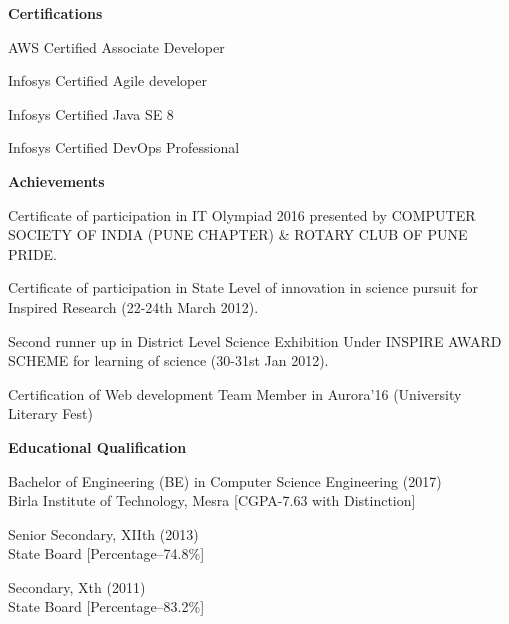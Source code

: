 \documentclass[a4paper,10pt]{article}
\newcommand{\resitem}[1]{\item #1}
\newcommand{\resheading}[1]{\vspace{0.5em} {\small \colorbox{mygrey}{{\begin{minipage}{0.975\textwidth}{{\textbf{#1}}}\end{minipage}}}} \vspace{0.5em}}
\begin{document}
\resheading{Certifications}
\resitem{AWS Certified Associate Developer}
\resitem{Infosys Certified Agile developer}
\resitem{Infosys Certified Java SE 8}
\resitem{Infosys Certified DevOps Professional}

\resheading{Achievements}
\resitem{Certificate of participation in IT Olympiad 2016 presented by COMPUTER SOCIETY OF INDIA (PUNE CHAPTER) & ROTARY CLUB OF PUNE PRIDE.}
\resitem{Certificate of participation in State Level of innovation in science pursuit for Inspired Research (22-24th March 2012).}
\resitem{Second runner up in District Level Science Exhibition Under INSPIRE AWARD SCHEME for learning of science (30-31st Jan 2012).}
\resitem{Certification of Web development Team Member in Aurora’16 (University Literary Fest)}

\resheading{Educational Qualification}
\resitem{Bachelor of Engineering (BE) in Computer Science Engineering (2017) \\ Birla Institute of Technology, Mesra [CGPA-7.63 with Distinction]}
\resitem{Senior Secondary, XIIth (2013) \\ State Board [Percentage–74.8\%]}
\resitem{Secondary, Xth (2011) \\ State Board [Percentage–83.2\%]}
\end{document}
